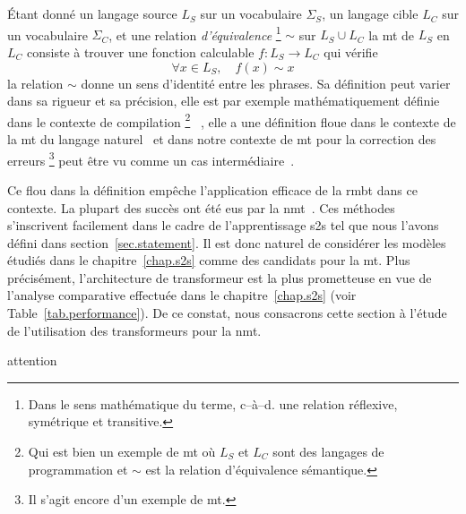 \section{}

Étant donné un langage source \(L_S\) sur un vocabulaire \(\Sigma_S\),
un langage cible \(L_C\) sur un vocabulaire \(\Sigma_C\),
et une relation \emph{d'équivalence}%
\footnote{Dans le sens mathématique du terme, c--à--d. une relation réflexive, symétrique et transitive.} %
\(\sim\) sur \(L_S \cup L_C\) %
la \gls{mt} de \(L_S\) en \(L_C\) consiste à trouver une fonction calculable \(f : L_S \rightarrow L_C\)
qui vérifie 
\begin{equation}
    \label{eq:mt-equivalence}
    \forall x \in L_S, \quad f(x) \sim x
\end{equation}
la relation \(\sim\) donne un sens d'identité entre les phrases.
Sa définition peut varier dans sa rigueur et sa précision,
elle est par exemple mathématiquement définie dans le contexte de compilation%
\footnote{Qui est bien un exemple de \gls{mt} où \(L_S\) et \(L_C\) sont des langages de programmation
et \(\sim\) est la relation d'équivalence sémantique.}%
~\cite{Hadj_2015},
elle a une définition floue dans le contexte de la \gls{mt} du langage naturel~\cite{routledge}
et dans notre contexte de \gls{mt} pour la correction des erreurs%
\footnote{Il s'agit encore d'un exemple de \gls{mt}.} %
peut être vu comme un cas intermédiaire~\cite{Bryant_Yuan_Qorib_Cao_Ng_Briscoe_2022}.

Ce flou dans la définition empêche l'application efficace de la \gls{rmbt} dans ce contexte.
La plupart des succès ont été eus par la \gls{nmt}~\cite{deep-nmt-survey}.
Ces méthodes s'inscrivent facilement dans le cadre de l'apprentissage \gls{s2s} 
tel que nous l'avons défini dans section~\ref{sec.statement}.
Il est donc naturel de considérer les modèles étudiés dans le chapitre~\ref{chap.s2s} 
comme des candidats pour la \gls{mt}.
Plus précisément, l'architecture de transformeur est la plus prometteuse en vue de l'analyse comparative
effectuée dans le chapitre~\ref{chap.s2s} (voir Table~\ref{tab.performance}).
De ce constat, nous consacrons cette section à l'étude de l'utilisation des transformeurs pour la \gls{nmt}.





{attention}